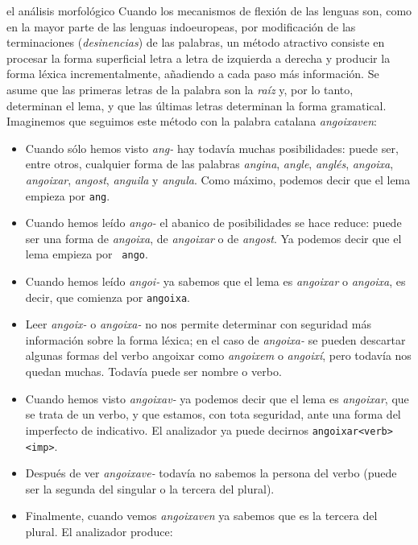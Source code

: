 \begin{persabermes}{el análisis morfológico} Cuando los mecanismos de
  flexión de las lenguas son, como en la mayor parte de las lenguas
  indoeuropeas, por modificación de las terminaciones
  (\emph{desinencias}) de las palabras, un método atractivo consiste
  en procesar la forma superficial letra a letra de izquierda a
  derecha y producir la forma léxica incrementalmente, añadiendo a
  cada paso más información. Se asume que las primeras letras de la
  palabra son la \emph{raíz} y, por lo tanto, determinan el lema, y
  que las últimas letras determinan la forma gramatical. Imaginemos
  que seguimos este método con la palabra catalana
  \emph{angoixaven}: \begin{itemize} \item Cuando sólo hemos visto
    \emph{ang-} hay todavía muchas posibilidades: puede ser, entre
    otros, cualquier forma de las palabras \emph{angina},
    \emph{angle}, \emph{anglés}, \emph{angoixa}, \emph{angoixar},
    \emph{angost}, {\em anguila} y \emph{angula}. Como máximo, podemos
    decir que el lema empieza por {\tt ang}. \item Cuando hemos leído
    \emph{ango-} el abanico de posibilidades se hace reduce:
    puede ser una forma de \emph{angoixa}, de \emph{angoixar} o de
    \emph{angost}. Ya podemos decir que el lema empieza por {\tt
      ango}. \item Cuando hemos leído \emph{angoi-} ya sabemos que el
    lema es \emph{angoixar} o \emph{angoixa}, es decir, que comienza
    por {\tt angoixa}. \item Leer \emph{angoix-} o \emph{angoixa-} no
    nos permite determinar con seguridad más información sobre la
    forma léxica; en el caso de \emph{angoixa-} se pueden descartar
    algunas formas del verbo angoixar como \emph{angoixem} o
    \emph{angoixí}, pero todavía nos quedan muchas. Todavía puede ser
    nombre o verbo. \item Cuando hemos visto \emph{angoixav-} ya
    podemos decir que el lema es \emph{angoixar}, que se trata de un
    verbo, y que estamos, con tota seguridad, ante una forma del
    imperfecto de indicativo. El analizador ya puede decirnos
    \texttt{angoixar<verb><imp>}. \item Después de ver
    \emph{angoixave-} todavía no sabemos la persona del verbo (puede
    ser la segunda del singular o la tercera del plural). \item
    Finalmente, cuando vemos \emph{angoixaven} ya sabemos que es la
    tercera del plural. El analizador produce:

\end{itemize}
\end{persabermes}
